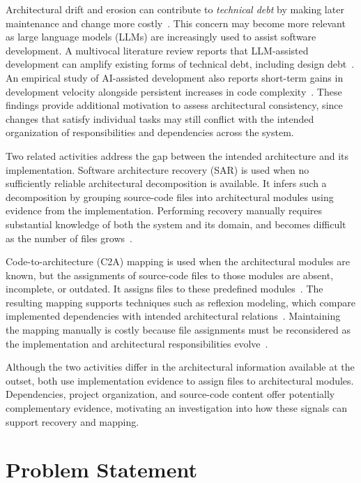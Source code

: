 Architectural drift and erosion can contribute to \emph{technical debt} by making later maintenance and change more costly~\cite{kruchten2012technicaldebt}. This concern may become more relevant as large language models (LLMs) are increasingly used to assist software development. A multivocal literature review reports that LLM-assisted development can amplify existing forms of technical debt, including design debt~\cite{ehsani2025fastercode}. An empirical study of AI-assisted development also reports short-term gains in development velocity alongside persistent increases in code complexity~\cite{he2026speed}. These findings provide additional motivation to assess architectural consistency, since changes that satisfy individual tasks may still conflict with the intended organization of responsibilities and dependencies across the system.

Two related activities address the gap between the intended architecture and its implementation. Software architecture recovery (SAR) is used when no sufficiently reliable architectural decomposition is available. It infers such a decomposition by grouping source-code files into architectural modules using evidence from the implementation. Performing recovery manually requires substantial knowledge of both the system and its domain, and becomes difficult as the number of files grows~\cite{garcia2013}.

Code-to-architecture (C2A) mapping is used when the architectural modules are known, but the assignments of source-code files to those modules are absent, incomplete, or outdated. It assigns files to these predefined modules~\cite{tzerpos1997orphan,christl2007automated}. The resulting mapping supports techniques such as reflexion modeling, which compare implemented dependencies with intended architectural relations~\cite{reflexion1}. Maintaining the mapping manually is costly because file assignments must be reconsidered as the implementation and architectural responsibilities evolve~\cite{ali2018architecture}.

Although the two activities differ in the architectural information available at the outset, both use implementation evidence to assign files to architectural modules. Dependencies, project organization, and source-code content offer potentially complementary evidence, motivating an investigation into how these signals can support recovery and mapping.

\section{Problem Statement}
\label{sec:intro-problem}

